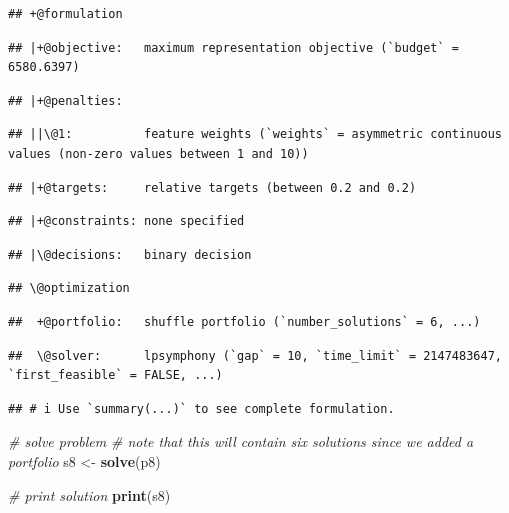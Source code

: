 \documentclass[12pt,]{book}
\newenvironment{Shaded}{\begin{snugshade}}{\end{snugshade}}
\newcommand{\CommentTok}[1]{\textcolor[rgb]{0.56,0.35,0.01}{\textit{#1}}}
\newcommand{\KeywordTok}[1]{\textcolor[rgb]{0.13,0.29,0.53}{\textbf{#1}}}
\newcommand{\NormalTok}[1]{#1}
\newcommand{\StringTok}[1]{\textcolor[rgb]{0.31,0.60,0.02}{#1}}
\begin{document}
\begin{verbatim}
## +@formulation
\end{verbatim}

\begin{verbatim}
## |+@objective:   maximum representation objective (`budget` = 6580.6397)
\end{verbatim}

\begin{verbatim}
## |+@penalties:
\end{verbatim}

\begin{verbatim}
## ||\@1:          feature weights (`weights` = asymmetric continuous values (non-zero values between 1 and 10))
\end{verbatim}

\begin{verbatim}
## |+@targets:     relative targets (between 0.2 and 0.2)
\end{verbatim}

\begin{verbatim}
## |+@constraints: none specified
\end{verbatim}

\begin{verbatim}
## |\@decisions:   binary decision
\end{verbatim}

\begin{verbatim}
## \@optimization
\end{verbatim}

\begin{verbatim}
##  +@portfolio:   shuffle portfolio (`number_solutions` = 6, ...)
\end{verbatim}

\begin{verbatim}
##  \@solver:      lpsymphony (`gap` = 10, `time_limit` = 2147483647, `first_feasible` = FALSE, ...)
\end{verbatim}

\begin{verbatim}
## # i Use `summary(...)` to see complete formulation.
\end{verbatim}

\begin{Shaded}
\begin{Highlighting}[]
\CommentTok{# solve problem}
\CommentTok{# note that this will contain six solutions since we added a portfolio}
\NormalTok{s8 <-}\StringTok{ }\KeywordTok{solve}\NormalTok{(p8)}

\CommentTok{# print solution}
\KeywordTok{print}\NormalTok{(s8)}
\end{Highlighting}
\end{Shaded}
\end{document}
